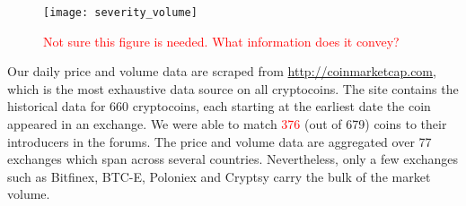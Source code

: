 \begin{figure}
\texttt{[image: severity\_volume]}
\caption{\textcolor{red}{Not sure this figure is needed. What information does it convey?}}
\end{figure}
Our daily price and volume data are scraped from \url{http://coinmarketcap.com}, which is the most exhaustive data source on all cryptocoins. The site contains the historical data for 660 cryptocoins, each starting at the earliest date the coin appeared in an exchange. We were able to match \textcolor{red}{376} (out of 679) coins to their introducers in the forums. The price and volume data are aggregated over 77 exchanges which span across several countries. Nevertheless, only a few exchanges such as Bitfinex, BTC-E, Poloniex and Cryptsy carry the bulk of the market volume.
